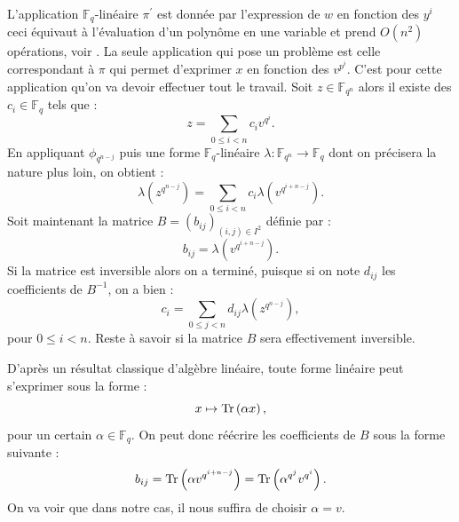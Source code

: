 \documentclass[a4paper]{article} %
\numberwithin{section}{part}
\numberwithin{equation}{section}
\newcommand\GF[1]{\mathbb{F}_{#1}}
\newcommand\Tr[1]{\textup{Tr}\left(#1\right)}
\begin{document}
L'application $\GF{q}$-linéaire $\pi^{\prime}$ est donnée par l'expression de 
$w$ en fonction des $y^i$ ceci équivaut à l'évaluation d'un polynôme en une
variable et prend $O(n^2)$ opérations, voir \cite[th. 5.1]{GaGe}. La seule 
application qui pose un problème est celle correspondant à $\pi$ qui permet 
d'exprimer $x$ en fonction des $v^{p^i}$. C'est pour cette application qu'on va 
devoir effectuer tout le travail. Soit $z\in\GF{q^n}$ alors il existe des 
$c_i\in\GF{q}$ tels que :
\begin{equation}
z = \sum_{0 \leq i < n}{c_iv^{q^i}}.
\end{equation}
En appliquant $\phi_{q^{n-j}}$ puis une forme $\GF{q}$-linéaire $\lambda
: \GF{q^n} \to \GF{q}$ dont on précisera la nature plus loin, on obtient :
\begin{equation}
\lambda\left(z^{q^{n-j}}\right) = \sum_{0\leq i < n}
{c_i\lambda\left(v^{q^{i+n-j}}\right)}.
\end{equation}
Soit maintenant la matrice $B = (b_{ij})_{(i,j)\in I^2}$ définie par :
\begin{equation}
b_{ij} = \lambda\left(v^{q^{i+n-j}}\right).
\end{equation}
Si la matrice est inversible alors on a terminé, puisque si on note $d_{ij}$ les
coefficients de $B^{-1}$, on a bien :
\begin{equation}
c_i = \sum_{0\leq j < n}{d_{ij}\lambda\left(z^{q^{n-j}}\right)},
\end{equation}
pour $0\leq i < n$. Reste à savoir si la matrice $B$ sera effectivement 
inversible.\par
D'après un résultat classique d'algèbre linéaire, toute forme linéaire peut
s'exprimer sous la forme :
\begin{equation}
x \mapsto \Tr{\alpha x},
\end{equation}
pour un certain $\alpha\in\GF{q}$. On peut donc réécrire les coefficients de $B$
sous la forme suivante :
\begin{equation}
b_{ij} = \Tr{\alpha v^{q^{i+n-j}}} = \Tr{\alpha^{q^j}v^{q^i}}.
\end{equation}
On va voir que dans notre cas, il nous suffira de choisir $\alpha = v$.
\end{document}
